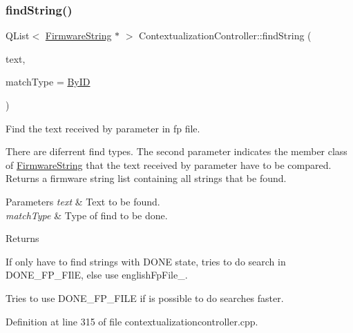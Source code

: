 \subsubsection{\texorpdfstring{find\+String()}{findString()}}
{\footnotesize\ttfamily Q\+List$<$ \mbox{\hyperlink{classFirmwareString}{Firmware\+String}} $\ast$ $>$ Contextualization\+Controller\+::find\+String (\begin{DoxyParamCaption}\item[{const Q\+String \&}]{text,  }\item[{const \mbox{\hyperlink{classContextualizationController_a211b7dd2dba820139e8055b4f88fdced}{Match\+Type}}}]{match\+Type = {\ttfamily \mbox{\hyperlink{classContextualizationController_a211b7dd2dba820139e8055b4f88fdcedab921b1883492c5a7511b20ec6a5f24f3}{By\+ID}}} }\end{DoxyParamCaption})\hspace{0.3cm}{\ttfamily [protected]}}



Find the text received by parameter in fp file. 

There are diferrent find types. The second parameter indicates the member class of \mbox{\hyperlink{classFirmwareString}{Firmware\+String}} that the text received by parameter have to be compared. Returns a firmware string list containing all strings that be found. 
\begin{DoxyParams}{Parameters}
{\em text} & Text to be found. \\
\hline
{\em match\+Type} & Type of find to be done. \\
\hline
\end{DoxyParams}
\begin{DoxyReturn}{Returns}

\end{DoxyReturn}
If only have to find strings with D\+O\+NE state, tries to do search in D\+O\+N\+E\+\_\+\+F\+P\+\_\+\+F\+IlE, else use english\+Fp\+File\+\_\+.

Tries to use D\+O\+N\+E\+\_\+\+F\+P\+\_\+\+F\+I\+LE if is possible to do searches faster.

Definition at line 315 of file contextualizationcontroller.\+cpp.

\mbox{\label{classContextualizationController_a737d2562702b3b0da946e7b2f9fa336d}} 
